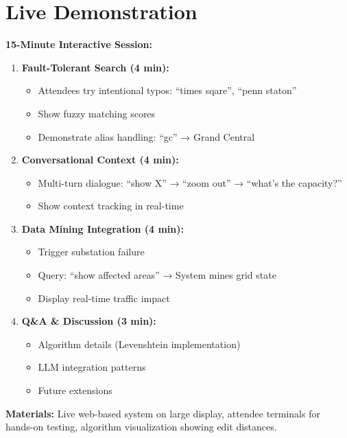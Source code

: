 \documentclass[sigconf]{acmart}
\begin{document}
\section{Live Demonstration}

\textbf{15-Minute Interactive Session:}

\begin{enumerate}
    \item \textbf{Fault-Tolerant Search (4 min):}
        \begin{itemize}
            \item Attendees try intentional typos: ``times sqare'', ``penn staton''
            \item Show fuzzy matching scores
            \item Demonstrate alias handling: ``gc'' → Grand Central
        \end{itemize}

    \item \textbf{Conversational Context (4 min):}
        \begin{itemize}
            \item Multi-turn dialogue: ``show X'' → ``zoom out'' → ``what's the capacity?''
            \item Show context tracking in real-time
        \end{itemize}

    \item \textbf{Data Mining Integration (4 min):}
        \begin{itemize}
            \item Trigger substation failure
            \item Query: ``show affected areas'' → System mines grid state
            \item Display real-time traffic impact
        \end{itemize}

    \item \textbf{Q\&A \& Discussion (3 min):}
        \begin{itemize}
            \item Algorithm details (Levenshtein implementation)
            \item LLM integration patterns
            \item Future extensions
        \end{itemize}
\end{enumerate}

\textbf{Materials:} Live web-based system on large display, attendee terminals for hands-on testing, algorithm visualization showing edit distances.
\end{document}
